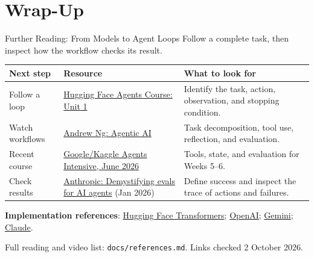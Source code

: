 \documentclass[aspectratio=169]{beamer}
\begin{document}
\section{Wrap-Up}

\begin{frame}{Further Reading: From Models to Agent Loops}
  \small Follow a complete task, then inspect how the workflow checks its result.
  \par\vspace{0.4em}
  {\footnotesize\renewcommand{\arraystretch}{1.15}
  \begin{tabular}{@{}>{\raggedright\arraybackslash}p{2.3cm}>{\raggedright\arraybackslash}p{5.0cm}>{\raggedright\arraybackslash}p{4.8cm}@{}}
    \toprule
    \textbf{Next step} & \textbf{Resource} & \textbf{What to look for} \\
    \midrule
    Follow a loop & \href{https://huggingface.co/learn/agents-course/en/unit1/agent-steps-and-structure}{Hugging Face Agents Course: Unit 1} & Identify the task, action, observation, and stopping condition. \\
    Watch workflows & \href{https://www.deeplearning.ai/courses/agentic-ai}{Andrew Ng: Agentic AI} & Task decomposition, tool use, reflection, and evaluation. \\
    Recent course & \href{https://www.kaggle.com/competitions/5-day-ai-agents-intensive-vibecoding-course-with-google}{Google/Kaggle Agents Intensive, June 2026} & Tools, state, and evaluation for Weeks 5--6. \\
    Check results & \href{https://www.anthropic.com/engineering/demystifying-evals-for-ai-agents}{Anthropic: Demystifying evals for AI agents} (Jan 2026) & Define success and inspect the trace of actions and failures. \\
    \bottomrule
  \end{tabular}\par}
  \vspace{0.6em}
  \small \textbf{Implementation references}: \href{https://huggingface.co/docs/transformers/en/index}{Hugging Face Transformers};
  \href{https://developers.openai.com/api/docs/}{OpenAI};
  \href{https://ai.google.dev/gemini-api/docs}{Gemini};
  \href{https://platform.claude.com/docs/en/home}{Claude}.
  \par\vspace{0.4em}
  {\scriptsize Full reading and video list: \texttt{docs/references.md}. Links checked 2 October 2026.}
\end{frame}
\end{document}
